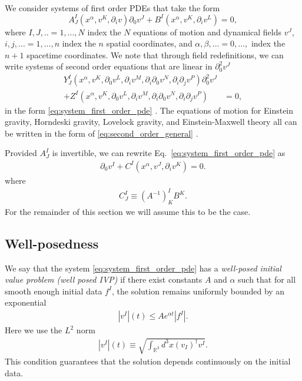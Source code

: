 \documentclass{ws-ijmpd}
\begin{document}
We consider systems of first order PDEs that take the form
\begin{equation}
\label{eq:system_first_order_pde}
   A^I_J\left(x^{\alpha},v^K,\partial_iv\right)\partial_0v^J
   +
   B^I\left(x^{\alpha},v^K,\partial_iv^L\right)
   =
   0
   ,
\end{equation} 
where $I,J,..=1,...,N$ index the $N$ 
equations of motion and dynamical fields $v^J$,
$i,j,...=1,...,n$ index the $n$ spatial coordinates, 
and $\alpha,\beta,...=0,...,$ index
the $n+1$ spacetime coordinates.
We note that through field redefinitions, we can write
systems of second order equations that are linear in $\partial_0^2v^J$
\begin{align}
\label{eq:second_order_general}
   Y^I_J\left(
      x^{\alpha},
      v^K,
      \partial_0v^L,
      \partial_iv^M,
      \partial_i\partial_0v^N,
      \partial_i\partial_jv^P
   \right)
   \partial_0^2v^J
   &\nonumber\\
   +
   Z^I\left(
      x^{\alpha},
      v^K,
      \partial_0v^L,
      \partial_iv^M,
      \partial_i\partial_0v^N,
      \partial_i\partial_jv^P
   \right)
   &=
   0
   ,
\end{align}
in the form 
\eqref{eq:system_first_order_pde}
\cite{Sarbach:2012pr,Hilditch:2013sba,Kovacs:2020pns}.
The equations of motion for Einstein gravity, 
Horndeski gravity, Lovelock
gravity, and Einstein-Maxwell theory all can be
written in the form of
\eqref{eq:second_order_general}
\cite{Papallo:2017qvl,Kovacs:2020pns,Davies:2021frz}.

Provided $A^I_J$ is invertible, we can rewrite
Eq.~\eqref{eq:system_first_order_pde} as
\begin{align}
\label{eq:system_first_order_pde_C}
   \partial_0v^I
   +
   C^I\left(x^{\alpha},v^J,\partial_iv^K\right)
   =
   0
   .
\end{align}
where
\begin{align}
   C^I_J
   \equiv
   \left(A^{-1}\right)^I_KB^K
   .
\end{align}
For the remainder of this section we will assume this to be the case.

\subsection{Well-posedness
\label{sec:well_posedness}
}

We say that the system \eqref{eq:system_first_order_pde} has a
\emph{well-posed initial value problem (well posed IVP)} if there
exist constants $A$ and $\alpha$ such that for all smooth enough
initial data $f^I$, the solution remains uniformly bounded by an exponential
\begin{align}
   \left|v^I\right|(t)
   \leq
   A e^{\alpha t} \left|f^I\right|
   .
\end{align}
Here we use the $L^2$ norm
\begin{align}
   \left|v^I\right|(t)
   \equiv
   \sqrt{
      \int_{\mathbb{R}^3} d^3x \left(v_I\right)^{\dagger} v^I
   }
   .
\end{align}
This condition guarantees that the
solution depends continuously on the initial data. 
\end{document}
